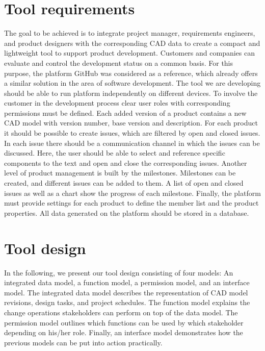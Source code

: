 \section{Tool requirements}
    \label{sec:requirements} 

    The goal to be achieved is to integrate project manager, requirements engineers, and product designers with the corresponding CAD data to create a compact and lightweight tool to support product development. Customers and companies can evaluate and control the development status on a common basis. For this purpose, the platform GitHub was considered as a reference, which already offers a similar solution in the area of software development. The tool we are developing should be able to run platform independently on different devices. To involve the customer in the development process clear user roles with corresponding permissions must be defined. Each added version of a product contains a new CAD model with version number, base version and description. For each product it should be possible to create issues, which are filtered by open and closed issues. 
    In each issue there should be a communication channel in which the issues can be discussed. 
    Here, the user should be able to select and reference specific components to the text and open and close the corresponding issues. 
    Another level of product management is built by the milestones. Milestones can be created, and different issues can be added to them. A list of open and closed issues as well as a chart show the progress of each milestone. Finally, the platform must provide settings for each product to define the member list and the product properties. All data generated on the platform should be stored in a database.

\section{Tool design}
    \label{sec:contribution}

    In the following, we present our tool design consisting of four models: An integrated data model, a function model, a permission model, and an interface model.
    The integrated data model describes the representation of CAD model revisions, design tasks, and project schedules.
    The function model explains the change operations stakeholders can perform on top of the data model.
    The permission model outlines which functions can be used by which stakeholder depending on his/her role.
    Finally, an interface model demonstrates how the previous models can be put into action practically.

